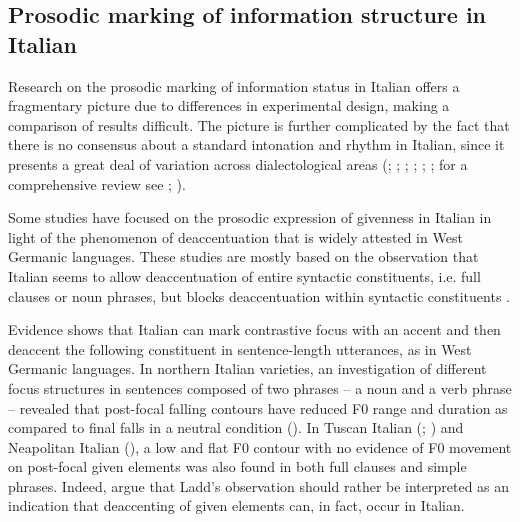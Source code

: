 \subsection{Prosodic marking of information structure in Italian}
\label{sec:2.1.4}
Research on the prosodic marking of information status in Italian offers a fragmentary picture due to differences in experimental design, making a comparison of results difficult. The picture is further complicated by the fact that there is no consensus about a standard intonation and rhythm in Italian, since it presents a great deal of variation across dialectological areas (\citealt{BertinettoLoporcaro2005}; \citealt{Canepari1980}; \citealt{Giordano2006}; \citealt{Lepschy1977}; \citealt{Magno-CaldognettoEtAl1978}; \citealt{Savino2012}; for a comprehensive review see \citealt{FivelaEtAl2015}; \citealt{Vietti2019}). 

Some studies have focused on the prosodic expression of givenness in Italian in light of the phenomenon of deaccentuation that is widely attested in West Germanic languages. These studies are mostly based on the observation that Italian seems to allow deaccentuation of entire syntactic constituents, i.e. full clauses or noun phrases, but blocks deaccentuation within syntactic constituents \citep{Ladd1996}.

Evidence shows that Italian can mark contrastive focus with an accent and then deaccent the following constituent in sentence-length utterances, as in West Germanic languages. In northern Italian varieties, an investigation of different focus structures in sentences composed of two phrases – a noun and a verb phrase – revealed that post-focal falling contours have reduced F0 range and duration as compared to final falls in a neutral condition (\citealt{FarnetaniZmarich1997}). In Tuscan Italian (\citealt{AvesaniEtAl1995}; \citealt{HirschbergAvesani1997}) and Neapolitan Italian (\citealt{DImperioHouse1997}), a low and flat F0 contour with no evidence of F0 movement on post-focal given elements was also found in both full clauses and simple phrases. Indeed, \citet{AvesaniEtAl2015} argue that Ladd’s observation should rather be interpreted as an indication that deaccenting of given elements can, in fact, occur in Italian. 

